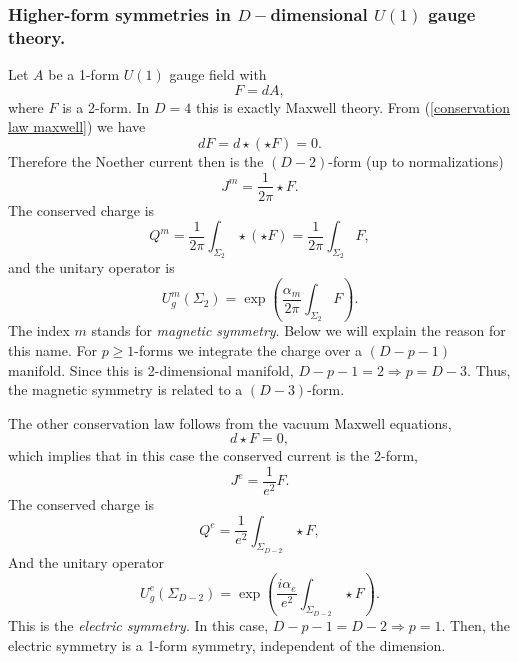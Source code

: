 \documentclass{article}
\begin{document}
\subsubsection{Higher-form symmetries in $D-$dimensional $U(1)$ gauge theory.}
Let $A$ be a 1-form $U(1)$ gauge field with 
\begin{equation}\label{conservation law maxwell}
	F=dA,
\end{equation}
where $F$ is a 2-form. In $D=4$ this is exactly Maxwell theory. From (\ref{conservation law maxwell}) we have
\begin{equation}\label{conservation F}
	dF=d\star(\star F)=0. 
\end{equation}
Therefore the Noether current then is the $(D-2)$-form (up to normalizations)
\begin{equation}
	J^m = \frac{1}{2\pi}\star F.
\end{equation}
The conserved charge is 
\begin{equation}
	Q^m=\frac{1}{2\pi}\int_{\Sigma_2}\star (\star F)=\frac{1}{2\pi}\int_{\Sigma_2}F,
\end{equation}
and the unitary operator is 
\begin{equation}
	U_g^m(\Sigma_2)=\exp\left(\frac{\alpha_m}{2\pi}\int_{\Sigma_2}F\right).
\end{equation}
The index $m$ stands for \textit{magnetic symmetry}. Below we will explain the reason for this name. For $p\geq 1$-forms we integrate the charge over a $(D-p-1)$ manifold. Since this is 2-dimensional manifold, $D-p-1=2\Rightarrow p=D-3$. Thus, the magnetic symmetry is related to a $(D-3)$-form. 

The other conservation law follows from the vacuum Maxwell equations,
\begin{equation}\label{conservation F star}
	d\star F=0,
\end{equation} 
which implies that in this case the conserved current is the 2-form,
\begin{equation}
	J^e = \frac{1}{e^2}F.
\end{equation}
The conserved charge is 
\begin{equation}
	Q^e=\frac{1}{e^2}\int_{\Sigma_{D-2}}\star F, 
\end{equation}
And the unitary operator
\begin{equation}
	U^e_g(\Sigma_{D-2})=\exp\left(\frac{i\alpha_e}{e^2}\int_{\Sigma_{D-2}}\star F\right).
\end{equation}
This is the \textit{electric symmetry}. In this case, $D-p-1=D-2\Rightarrow p=1$. Then, the electric symmetry is a 1-form symmetry, independent of the dimension. 
\end{document}
